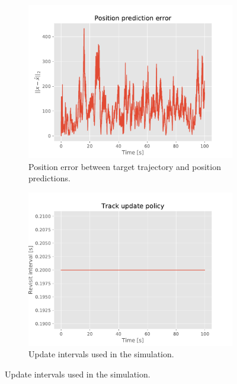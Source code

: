 \documentclass[english, 12pt, a4paper, elec, utf8, a-1b, online]{aaltothesis}
\begin{document}
\begin{figure}
    \centering
    \begin{subfigure}[b]{0.45\textwidth}
        \centering
        \includegraphics[width=\textwidth]{figures/simulations/position_error.pdf}
        \caption{Position error between target trajectory and position predictions.}
        \label{fig:sim_pos_error}
    \end{subfigure}
    \hfill
    \begin{subfigure}[b]{0.45\textwidth}
        \centering
        \includegraphics[width=\textwidth]{figures/simulations/update_policy.pdf}
        \caption{Update intervals used in the simulation.}
        \label{fig:sim_update_policy}
    \end{subfigure}

\end{figure}
\end{document}
